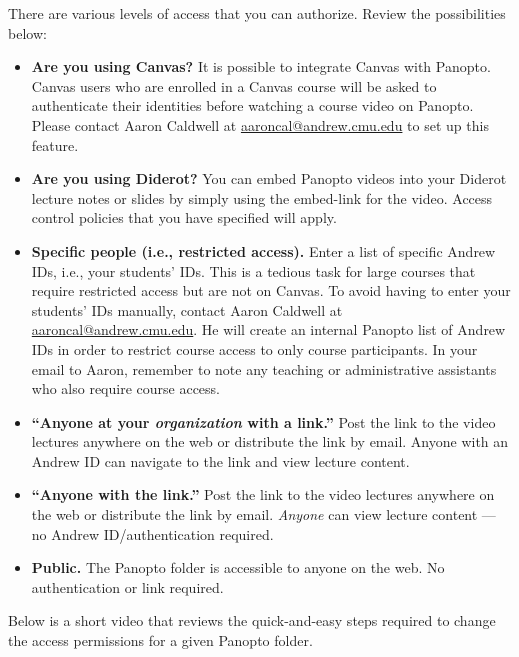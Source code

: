 \begin{gram}
	There are various levels of access that you can authorize. Review the possibilities below:

\begin{itemize}
		\item \textbf{Are you using Canvas?} It is possible to integrate Canvas with Panopto. Canvas users who are enrolled in a Canvas course will be asked to authenticate their identities before watching a course video on Panopto. Please contact Aaron Caldwell at \href{mailto:aaroncal@andrew.cmu.edu?subject=Canvas and Panopto}{aaroncal@andrew.cmu.edu} to set up this feature.

		\item \textbf{Are you using Diderot?} You can embed Panopto videos into your Diderot lecture notes or slides by simply using the embed-link for the video. Access control policies that you have specified will apply.

		\item \textbf{Specific people (i.e., restricted access).} Enter a list of specific Andrew IDs, i.e., your students’ IDs. This is a tedious task for large courses that require restricted access but are not on Canvas. To avoid having to enter your students’ IDs manually, contact Aaron Caldwell at \href{mailto:aaroncal@andrew.cmu.edu?subject=Restrict Course Access}{aaroncal@andrew.cmu.edu}. He will create an internal Panopto list of Andrew IDs in order to restrict course access to only course participants. In your email to Aaron, remember to note any teaching or administrative assistants who also require course access.
		\item \textbf{``Anyone at your \emph{organization} with a link.''} Post the link to the video lectures anywhere on the web or distribute the link by email. Anyone with an Andrew ID can navigate to the link and view lecture content.
		\item \textbf{``Anyone with the link.''} Post the link to the video lectures anywhere on the web or distribute the link by email. \emph{Anyone} can view lecture content --- no Andrew ID/authentication required.
		\item \textbf{Public.} The Panopto folder is accessible to anyone on the web. No authentication or link required.
	\end{itemize}
\end{gram}

\begin{gram}
	 Below is a short video that reviews the quick-and-easy steps required to change the access permissions for a given Panopto folder.

\end{gram}

